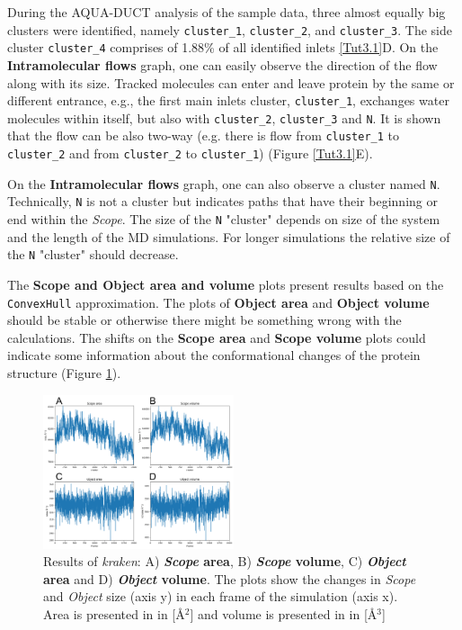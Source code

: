 \documentclass[9pt,tutorial]{livecoms}
\begin{document}
During the AQUA-DUCT analysis of the sample data, three almost equally big clusters were identified, namely \texttt{cluster\_1}, \texttt{cluster\_2}, and \texttt{cluster\_3}. The side cluster \texttt{cluster\_4} comprises of 1.88\% of all identified inlets \ref{Tut3.1}D. On the \textbf{Intramolecular flows} graph, one can easily observe the direction of the flow along with its size. Tracked molecules can enter and leave protein by the same or different entrance, e.g., the first main inlets cluster, \texttt{cluster\_1}, exchanges water molecules within itself, but also with \texttt{cluster\_2}, \texttt{cluster\_3} and \texttt{N}. It is shown that the flow can be also two-way (e.g. there is flow from \texttt{cluster\_1} to \texttt{cluster\_2} and from \texttt{cluster\_2} to \texttt{cluster\_1}) (Figure \ref{Tut3.1}E). 

On the \textbf{Intramolecular flows} graph, one can also observe a cluster named \texttt{N}. Technically, \texttt{N} is not a cluster but indicates paths that have their beginning or end within the \emph{Scope}. The size of the \texttt{N} "cluster" depends on size of the system and the length of the MD simulations. For longer simulations the relative size of the \texttt{N} "cluster" should decrease.

The \textbf{Scope and Object area and volume} plots present results based on the \texttt{ConvexHull} approximation. The plots of \textbf{Object area} and \textbf{Object volume} should be stable or otherwise there might be something wrong with the calculations. The shifts on the \textbf{Scope area} and \textbf{Scope volume} plots could indicate some information about the conformational changes of the protein structure (Figure \ref{Tut3.2}).

\begin{figure}[htb!]
\centering
\includegraphics[width=0.5\textwidth]{Tut3.2.png}
\caption{Results of \textit{kraken}: A) \textbf{\textit{Scope} area}, B) \textbf{\textit{Scope} volume}, C) \textbf{\textit{Object} area} and D) \textbf{\textit{Object} volume}. The plots show the changes in \textit{Scope} and \textit{Object} size (axis y) in each frame of the simulation (axis x). Area is presented in in [Å\( \displaystyle ^{2}\)] and volume is presented in in [Å\( \displaystyle ^{3}\)]} 
\label{Tut3.2}
\end{figure}
\end{document}
